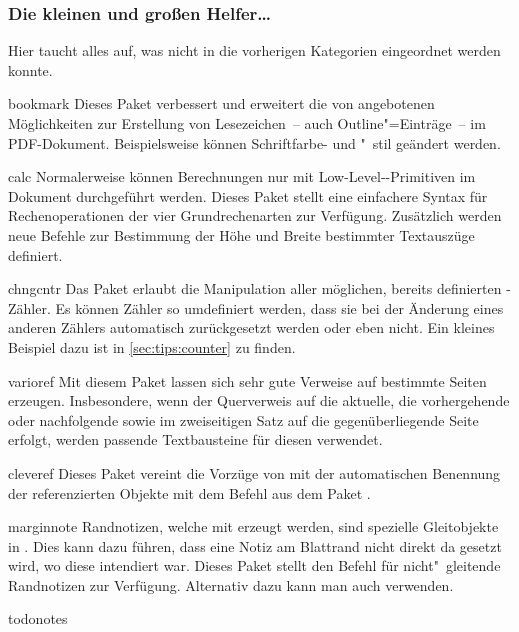 \subsubsection{Die kleinen und großen Helfer\dots}
Hier taucht alles auf, was nicht in die vorherigen Kategorien eingeordnet 
werden konnte.
%
\begin{packages}
\item[bookmark]
  Dieses Paket verbessert und erweitert die von  angebotenen 
  Möglichkeiten zur Erstellung von Lesezeichen~-- auch Outline"=Einträge~-- im 
  PDF-Dokument. Beispielsweise können Schriftfarbe- und "~stil geändert werden.
\item[calc]
  Normalerweise können Berechnungen nur mit Low-Level--Primitiven 
  im Dokument durchgeführt werden. Dieses Paket stellt eine einfachere Syntax 
  für Rechenoperationen der vier Grundrechenarten zur Verfügung. Zusätzlich 
  werden neue Befehle zur Bestimmung der Höhe und Breite bestimmter Textauszüge 
  definiert.
\item[chngcntr]
  Das Paket erlaubt die Manipulation aller möglichen, bereits definierten 
  -Zähler. Es können Zähler so umdefiniert werden, dass sie bei 
  der Änderung eines anderen Zählers automatisch zurückgesetzt werden oder eben 
  nicht. Ein kleines Beispiel dazu ist in \autoref{sec:tips:counter} zu finden.
\item[varioref]
  Mit diesem Paket lassen sich sehr gute Verweise auf bestimmte Seiten 
  erzeugen. Insbesondere, wenn der Querverweis auf die aktuelle, die 
  vorhergehende oder nachfolgende sowie im zweiseitigen Satz auf die 
  gegenüberliegende Seite erfolgt, werden passende Textbausteine für diesen 
  verwendet.
\item[cleveref]
  Dieses Paket vereint die Vorzüge von  mit der automatischen 
  Benennung der referenzierten Objekte mit dem Befehl  aus dem 
  Paket .
\item[marginnote]
  Randnotizen, welche mit  erzeugt werden, sind spezielle 
  Gleitobjekte in . Dies kann dazu führen, dass eine Notiz am 
  Blattrand nicht direkt da gesetzt wird, wo diese intendiert war. Dieses Paket 
  stellt den Befehl  für nicht"~gleitende Randnotizen zur 
  Verfügung. Alternativ dazu kann man auch  verwenden.
\item[todonotes]

\end{packages}
